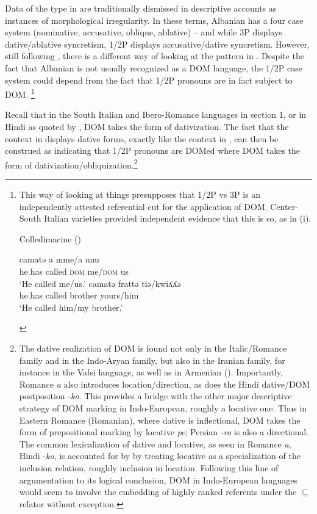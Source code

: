 \documentclass[output=paper]{langscibook}
\begin{document}
Data of the type in  are traditionally dismissed in descriptive accounts as instances of morphological irregularity. In these terms, Albanian has a four case system (nominative, accusative, oblique, ablative) – and while 3P displays dative/ablative syncretism, 1/2P displays accusative/dative syncretism. However, still following \citet{ManziniSavoia2014}, there is a different way of looking at the pattern in . Despite the fact that Albanian is not usually recognized as a DOM language, the 1/2P case system could depend from the fact that 1/2P pronouns are in fact subject to DOM.{} \footnote{This way of looking at things presupposes that 1/2P vs 3P is an independently attested referential cut for the application of DOM. Center-South Italian varieties provided independent evidence that this is so, as in (i).

\ea\label{ex:manzini:}
Colledimacine (\citealt{ManziniSavoia2005})\\
\begin{xlist}
\ex {} {camatə} {a} {mme/a} {nnu}\\
{he.has}  {called} \textsc{dom} {me/\textsc{dom}} {us}\\
\glt ‘He called me/us.’
\ex {}   {camatə} {frattə} {tiə/kwiʎʎə}\\
{he.has}  called   brother yours/him\\
\glt ‘He called him/my brother.’
\end{xlist}
\z
}

Recall that in the South Italian and Ibero-Romance languages in section 1, or in Hindi as quoted by \citet{Torrego1998}, DOM takes the form of dativization. The fact that the context in  displays dative forms, exactly like the context in , can then be construed as indicating that 1/2P pronouns are DOMed where DOM takes the form of dativization/obliquization.\footnote{{ The dative realization of DOM is found not only in the Italic/Romance family and in the Indo-Aryan family, but also in the Iranian family, for instance in the Vafsi language, as well as in Armenian (\citealt{ManziniFranco2016}). Importantly, Romance \textit{a} also introduces location/direction, as does the Hindi dative/DOM postposition -\textit{ko}.} This provides a bridge with the other major descriptive strategy of DOM marking in Indo-European, roughly a locative one. Thus in Eastern Romance (Romanian), where dative is inflectional, DOM takes the form of prepositional marking by locative \textit{pe}; Persian \textit{{}-ro} is also a directional.  The common lexicalization of dative and locative, as seen in Romance \textit{a}, Hindi -\textit{ko}, is accounted for by \citet{FrancoManzini2017} by treating locative as a specialization of the inclusion relation, roughly inclusion in location. Following this line of argumentation to its logical conclusion, DOM in Indo-European languages would seem to involve the embedding of highly ranked referents under the \textrm{${\subseteq}$} relator without exception.}  
\end{document}
